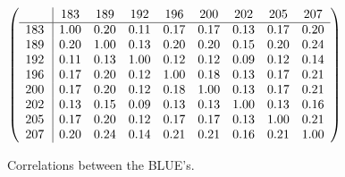 \begin{table}[H]
\scriptsize
\begin{center}
\renewcommand{\arraystretch}{1.1}
\begin{math}\left(\begin{array}{c|cccccccc}
 & \mathrm{183} & 
\mathrm{189} & 
\mathrm{192} & 
\mathrm{196} & 
\mathrm{200} & 
\mathrm{202} & 
\mathrm{205} & 
\mathrm{207} \\
\hline
\mathrm{183} \hspace*{2pt} &       1.00 &       0.20 &       0.11 &       0.17 &       0.17 &       0.13 &       0.17 &       0.20 \\
\mathrm{189} \hspace*{2pt} &       0.20 &       1.00 &       0.13 &       0.20 &       0.20 &       0.15 &       0.20 &       0.24 \\
\mathrm{192} \hspace*{2pt} &       0.11 &       0.13 &       1.00 &       0.12 &       0.12 &       0.09 &       0.12 &       0.14 \\
\mathrm{196} \hspace*{2pt} &       0.17 &       0.20 &       0.12 &       1.00 &       0.18 &       0.13 &       0.17 &       0.21 \\
\mathrm{200} \hspace*{2pt} &       0.17 &       0.20 &       0.12 &       0.18 &       1.00 &       0.13 &       0.17 &       0.21 \\
\mathrm{202} \hspace*{2pt} &       0.13 &       0.15 &       0.09 &       0.13 &       0.13 &       1.00 &       0.13 &       0.16 \\
\mathrm{205} \hspace*{2pt} &       0.17 &       0.20 &       0.12 &       0.17 &       0.17 &       0.13 &       1.00 &       0.21 \\
\mathrm{207} \hspace*{2pt} &       0.20 &       0.24 &       0.14 &       0.21 &       0.21 &       0.16 &       0.21 &       1.00 \\
\end{array}\right)\end{math}
\caption{Correlations between the BLUE's.}
\renewcommand{\arraystretch}{1}
\end{center}
\end{table}
